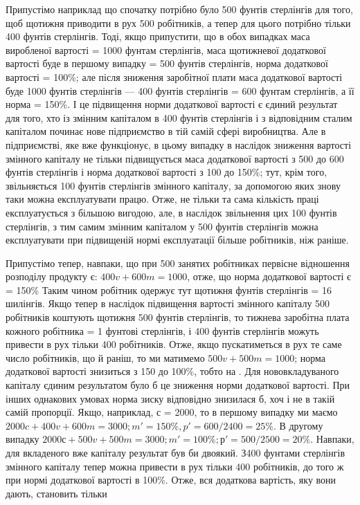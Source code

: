 Припустімо наприклад що спочатку потрібно було 500 фунтів
стерлінгів для того, щоб щотижня приводити в рух 500 робітників, а тепер для цього потрібно тільки
400 фунтів стерлінгів.
Тоді, якщо припустити, що в обох випадках маса виробленої
вартості = 1000 фунтам стерлінгів, маса щотижневої додаткової вартості буде в першому випадку = 500
фунтів стерлінгів, норма додаткової вартості  = 100\%; але після зниження заробітної плати
маса додаткової вартості буде 1000 фунтів стерлінгів — 400 фунтів стерлінгів = 600 фунтам
стерлінгів, а її норма  = 150\%. І це підвищення норми додаткової вартості є єдиний результат
для того, хто із змінним капіталом в 400 фунтів стерлінгів і з відповідним сталим капіталом починає
нове підприємство в тій самій сфері виробництва. Але в підприємстві, яке вже функціонує, в цьому
випадку в наслідок зниження вартості змінного
капіталу не тільки підвищується маса додаткової вартості з 500
до 600 фунтів стерлінгів і норма додаткової вартості з 100
до 150\%; тут, крім того, звільняється 100 фунтів стерлінгів
змінного капіталу, за допомогою яких знову таки можна експлуатувати працю. Отже, не тільки та сама
кількість праці експлуатується з більшою вигодою, але, в наслідок звільнення цих 100 фунтів
стерлінгів, з тим самим змінним капіталом у 500 фунтів стерлінгів можна експлуатувати при підвищеній
нормі експлуатації більше робітників, ніж раніше.

Припустімо тепер, навпаки, що при 500 занятих робітниках
первісне відношення розподілу продукту є: $400 v + 600 m = 1000$, отже, що норма додаткової вартості є
= 150\% Таким
чином робітник одержує тут щотижня  фунтів стерлінгів = 16 шилінгів. Якщо тепер в наслідок
підвищення вартості
змінного капіталу 500 робітників коштують щотижня 500 фунтів
стерлінгів, то тижнева заробітна плата кожного робітника = 1 фунтові стерлінгів, і 400 фунтів
стерлінгів можуть привести
в рух тільки 400 робітників. Отже, якщо пускатиметься в рух те
саме число робітників, що й раніш, то ми матимемо $500 v + 500 m = 1000$; норма додаткової вартості
знизиться з 150 до 100\%,
тобто на . Для нововкладуваного капіталу єдиним результатом було б це зниження норми додаткової
вартості. При інших
однакових умовах норма зиску відповідно знизилася б, хоч і не
в такій самій пропорції. Якщо, наприклад, с = 2000, то в
першому випадку ми маємо $2000 c + 400 v + 600 m = 3000; m' = 150\%, p' = 600/2400 = 25\%$. В другому
випадку $2000 с + 500 v + 500 m = 3000; m' = 100\%; р' = 500/2500 = 20\%$. Навпаки, для вкладеного вже
капіталу результат був би двоякий. З400 фунтами
стерлінгів змінного капіталу тепер можна привести в рух тільки
400 робітників, до того ж при нормі додаткової вартості в 100\%.
Отже, вся додаткова вартість, яку вони дають, становить тільки
\parbreak{}  %
